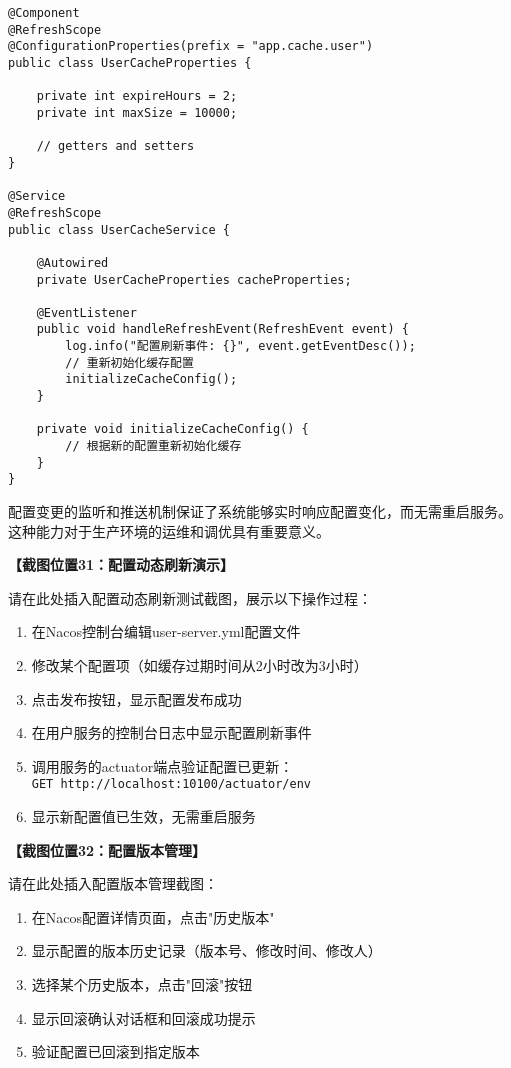 \documentclass[a4paper,12pt]{article}
\begin{document}
\begin{lstlisting}[caption=配置动态刷新实现]
@Component
@RefreshScope
@ConfigurationProperties(prefix = "app.cache.user")
public class UserCacheProperties {
    
    private int expireHours = 2;
    private int maxSize = 10000;
    
    // getters and setters
}

@Service
@RefreshScope
public class UserCacheService {
    
    @Autowired
    private UserCacheProperties cacheProperties;
    
    @EventListener
    public void handleRefreshEvent(RefreshEvent event) {
        log.info("配置刷新事件: {}", event.getEventDesc());
        // 重新初始化缓存配置
        initializeCacheConfig();
    }
    
    private void initializeCacheConfig() {
        // 根据新的配置重新初始化缓存
    }
}
\end{lstlisting}

配置变更的监听和推送机制保证了系统能够实时响应配置变化，而无需重启服务。这种能力对于生产环境的运维和调优具有重要意义。

\textbf{【截图位置31：配置动态刷新演示】}

请在此处插入配置动态刷新测试截图，展示以下操作过程：
\begin{enumerate}
\item 在Nacos控制台编辑user-server.yml配置文件
\item 修改某个配置项（如缓存过期时间从2小时改为3小时）
\item 点击发布按钮，显示配置发布成功
\item 在用户服务的控制台日志中显示配置刷新事件
\item 调用服务的actuator端点验证配置已更新：\\
  \texttt{GET http://localhost:10100/actuator/env}
\item 显示新配置值已生效，无需重启服务
\end{enumerate}

\textbf{【截图位置32：配置版本管理】}

请在此处插入配置版本管理截图：
\begin{enumerate}
\item 在Nacos配置详情页面，点击"历史版本"
\item 显示配置的版本历史记录（版本号、修改时间、修改人）
\item 选择某个历史版本，点击"回滚"按钮
\item 显示回滚确认对话框和回滚成功提示
\item 验证配置已回滚到指定版本
\end{enumerate}
\end{document}

